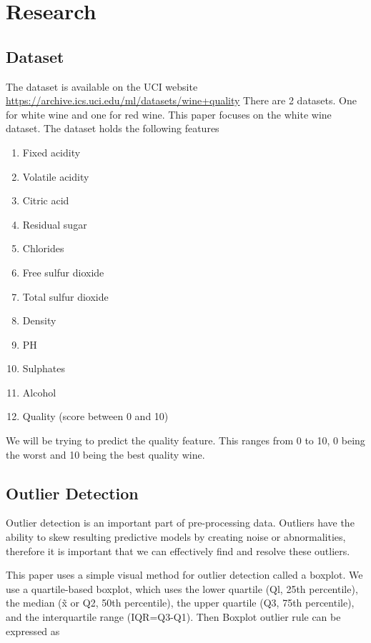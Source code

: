 \section{Research}

\subsection{Dataset}

The dataset is available on the UCI website \url{https://archive.ics.uci.edu/ml/datasets/wine+quality} There are 2 datasets. One for white wine and one for red wine. This paper focuses on the white wine dataset. The dataset holds the following features

\begin{enumerate}
  \item Fixed acidity 
  \item Volatile acidity
  \item Citric acid 
  \item Residual sugar 
  \item Chlorides
  \item Free sulfur dioxide 
  \item Total sulfur dioxide 
  \item Density
  \item PH
  \item Sulphates
  \item Alcohol
  \item Quality (score between 0 and 10)
\end{enumerate}

We will be trying to predict the quality feature. This ranges from 0 to 10, 0 being the worst and 10 being the best quality wine.

\subsection{Outlier Detection}

Outlier detection is an important part of pre-processing data. Outliers have the ability to skew resulting predictive models by creating noise or abnormalities, therefore it is important that we can effectively find and resolve these outliers.

This paper uses a simple visual method for outlier detection called a boxplot.
We use a quartile-based boxplot, which uses the lower quartile (Ql, 25th percentile), the median (x̃  or Q2, 50th percentile), the upper quartile (Q3, 75th percentile), and the interquartile range (IQR=Q3-Q1). Then Boxplot outlier rule can be expressed as\cite{6520712}

